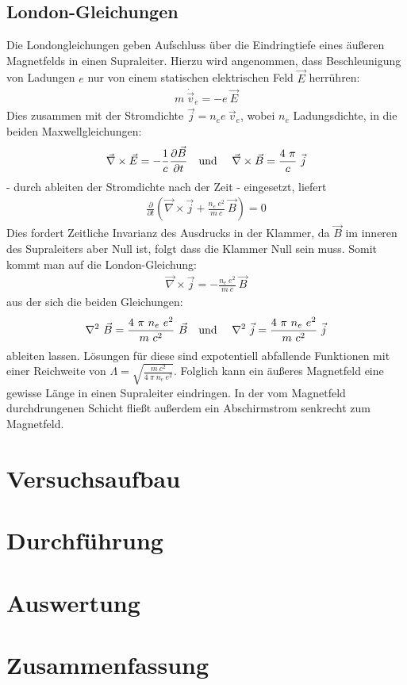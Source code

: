 \documentclass[12pt]{article}
\begin{document}
\subsection{London-Gleichungen}
\label{london}
Die Londongleichungen geben Aufschluss über die Eindringtiefe eines äußeren Magnetfelds in einen Supraleiter.
Hierzu wird angenommen, dass Beschleunigung von Ladungen $e$ nur von einem statischen elektrischen Feld $\vec E$ herrühren:
\begin{align}
 m~\dot{\vec{v}}_e = - e~ \vec E
\end{align}
Dies zusammen mit der Stromdichte $\vec j = n_e e~\vec v_e$, wobei $n_e$ Ladungsdichte, in die beiden Maxwellgleichungen:
\begin{align}
 \vec\nabla \times \vec E = - \frac{1}{c}\frac{\partial\vec B}{\partial t} \textnormal{\quad und \quad} 
 \vec\nabla \times \vec B =  \frac{4~\pi}{c}~\vec j
\end{align}
- durch ableiten der Stromdichte nach der Zeit - eingesetzt, liefert
\begin{align}
 \frac{\partial}{\partial t} \left( \vec\nabla\times\vec j +  \frac{n_e~e^2}{m~c}~\vec B\right) = 0
\end{align}
Dies fordert Zeitliche Invarianz des Ausdrucks in der Klammer, da $\vec B$ im inneren des Supraleiters aber Null ist, folgt dass die Klammer Null sein muss. Somit kommt man auf die London-Gleichung:
\begin{align}
 \vec\nabla\times\vec j = -\frac{n_e~e^2}{m~c}~\vec B
\end{align}
aus der sich die beiden Gleichungen:
\begin{align}
 \nabla^2~\vec B = \frac{4~\pi~n_e~e^2}{m~c^2}~\vec B \textnormal{\quad und \quad} \nabla^2~\vec j = \frac{4~\pi~n_e~e^2}{m~c^2}~\vec j
\end{align}
ableiten lassen. Lösungen für diese sind expotentiell abfallende Funktionen mit einer Reichweite von $\Lambda =\sqrt{\frac{m~c^2}{4~\pi~n_e~e^2}}$. Folglich kann ein äußeres Magnetfeld eine gewisse Länge in einen Supraleiter eindringen. In der vom Magnetfeld durchdrungenen Schicht fließt außerdem ein Abschirmstrom senkrecht zum Magnetfeld.


\section{Versuchsaufbau}

\section{Durchführung}

\section{Auswertung}

\section{Zusammenfassung}
\end{document}
